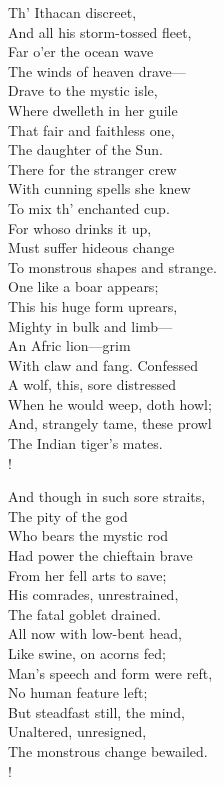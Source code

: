 \documentclass[12pt]{book}
\newenvironment{ipoem}[1]%
  {\setcounter{poemindentevery}{#1}\begin{poem}\small}%
  {\end{poem}\setcounter{poemindentevery}{0}}
\begin{document}
\begin{ipoem}{0}
    Th' Ithacan discreet, \\
    And all his storm-tossed fleet, \\
    Far o'er the ocean wave \\
    The winds of heaven drave--- \\
    Drave to the mystic isle, \\
    Where dwelleth in her guile \\
    That fair and faithless one, \\
    The daughter of the Sun. \\
    There for the stranger crew \\
    With cunning spells she knew \\
    To mix th' enchanted cup. \\
    For whoso drinks it up, \\
    Must suffer hideous change \\
    To monstrous shapes and strange. \\
    One like a boar appears; \\
    This his huge form uprears, \\
    Mighty in bulk and limb--- \\
    An Afric lion---grim \\
    With claw and fang. Confessed \\
    A wolf, this, sore distressed \\
    When he would weep, doth howl; \\
    And, strangely tame, these prowl \\
    The Indian tiger's mates. \\!

    And though in such sore straits, \\
    The pity of the god \\
    Who bears the mystic rod \\
    Had power the chieftain brave \\
    From her fell arts to save; \\
    His comrades, unrestrained, \\
    The fatal goblet drained. \\
    All now with low-bent head, \\
    Like swine, on acorns fed; \\
    Man's speech and form were reft, \\
    No human feature left; \\
    But steadfast still, the mind, \\
    Unaltered, unresigned, \\
    The monstrous change bewailed. \\!


\end{ipoem}
\end{document}
